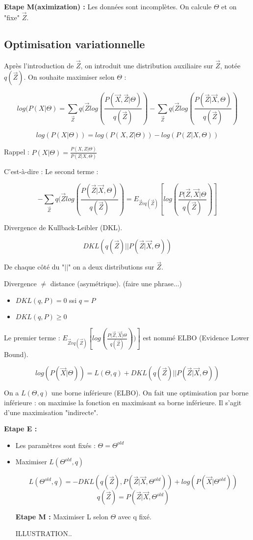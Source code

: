 \documentclass{article}
\begin{document}
\textbf{Etape M(aximization) :} Les données sont incomplètes. On calcule $\Theta$ et on "fixe" $\vec{Z}$.

\subsection{Optimisation variationnelle}

Après l'introduction de $\vec{Z}$, on introduit une distribution auxiliaire sur $\vec{Z}$, notée $q(\vec{Z})$. On souhaite maximiser selon $\Theta$ : 

\[ log(P(X | \Theta) = \sum_{\vec{Z}} q(\vec{Z} log(\frac{P(\vec{X}, \vec{Z} | \Theta)}{q(\vec{Z})} ) - \sum_{\vec{Z}} q(\vec{Z} log(\frac{P(\vec{Z} | \vec{X}, \Theta)}{q(\vec{Z})} ) \]

\[ log(P(X | \Theta)) = log(P(X, Z | \Theta)) - log(P(Z | X, \Theta)) \]

Rappel : $P(X | \Theta) = \frac{P(X, Z | \Theta)}{P(Z | X, \Theta)}$

C'est-à-dire : Le second terme : 

\[ - \sum_{\vec{Z}} q(\vec{Z} log(\frac{P(\vec{Z} | \vec{X}, \Theta)}{q(\vec{Z})} ) = E_{\vec{Z}vq(\vec{Z})} [log(\frac{P(\vec{Z}, \vec{X} | \Theta}{q(\vec{Z})})]  \]

Divergence de Kullback-Leibler (DKL).

\[ DKL(q(\vec{Z}) || P(\vec{Z} | \vec{X}, \Theta)) \]

De chaque côté du "$||$" on a deux distributions sur $\vec{Z}$.

Divergence $\ne$ distance (asymétrique). (faire une phrase...)
\begin{itemize}
\item $DKL(q, P) = 0$ ssi $q = P$
\item $DKL(q, P) \geq 0$ 
\end{itemize}

Le premier terme : $ E_{\vec{Z} v q(\vec{Z})} [log(\frac{P(\vec{Z}, \vec{X} | \Theta}{q(\vec{Z})}))] $ est nommé ELBO (Evidence Lower Bound).

\[ log(P(\vec{X} | \Theta)) = L(\Theta, q) + DKL(q(\vec{Z}) || P(\vec{Z} | \vec{X}, \Theta))  \]

On a $L(\Theta, q)$ une borne inférieure (ELBO). On fait une optimisation par borne inférieure : on maximise la fonction en maximisant sa borne inférieure. Il s'agit d'une maximisation "indirecte".

\textbf{Etape E :} 
\begin{itemize}
\item Les paramètres sont fixés : $\Theta = \Theta^{old}$
\item Maximiser $L(\Theta^{old}, q)$

\[ L(\Theta^{old}, q) = - DKL(q(\vec{Z}), P(\vec{Z} | \vec{X}, \Theta^{old})) + log (P(\vec{X} | \Theta^{old})) \]
\[ q(\vec{Z}) = P(\vec{Z} | \vec{X}, \Theta^{old})  \]

\textbf{Etape M :} Maximiser L selon $\Theta$ avec q fixé.

ILLUSTRATION..
\end{itemize}
\end{document}
